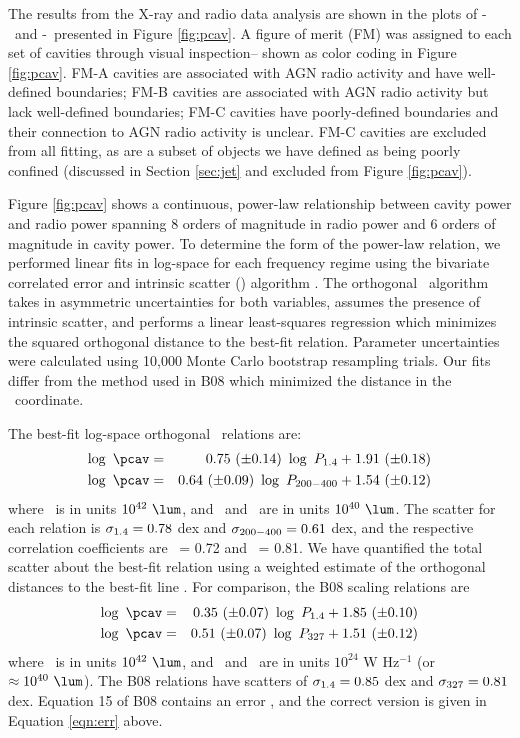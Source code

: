 \documentclass[12pt, preprint]{aastex}
\begin{document}
The results from the X-ray and radio data analysis are shown in the
plots of \pcav-\phigh\ and \pcav-\plow\ presented in Figure
\ref{fig:pcav}. A figure of merit (FM) was assigned to each set of
cavities through visual inspection-- shown as color coding in Figure
\ref{fig:pcav}. FM-A cavities are associated with AGN radio activity
and have well-defined boundaries; FM-B cavities are associated with
AGN radio activity but lack well-defined boundaries; FM-C cavities
have poorly-defined boundaries and their connection to AGN radio
activity is unclear. FM-C cavities are excluded from all fitting, as
are a subset of objects we have defined as being poorly confined
(discussed in Section \ref{sec:jet} and excluded from Figure
\ref{fig:pcav}).

Figure \ref{fig:pcav} shows a continuous, power-law relationship
between cavity power and radio power spanning 8 orders of magnitude in
radio power and 6 orders of magnitude in cavity power. To determine
the form of the power-law relation, we performed linear fits in
log-space for each frequency regime using the bivariate correlated
error and intrinsic scatter (\bces) algorithm \citep{bces}. The
orthogonal \bces\ algorithm takes in asymmetric uncertainties for both
variables, assumes the presence of intrinsic scatter, and performs a
linear least-squares regression which minimizes the squared orthogonal
distance to the best-fit relation. Parameter uncertainties were
calculated using 10,000 Monte Carlo bootstrap resampling trials. Our
fits differ from the method used in B08 which minimized the distance
in the \pcav\ coordinate.

The best-fit log-space orthogonal \bces\ relations are:
\begin{eqnarray}
  \log~\pcav &=& 0.75~(\pm 0.14)~\log~\phigh + 1.91~(\pm 0.18) \label{eqn:high}\\
  \log~\pcav &=& 0.64~(\pm 0.09)~\log~\plow + 1.54~(\pm 0.12) \label{eqn:low}
\end{eqnarray}
where \pcav\ is in units $10^{42} ~\lum$, and \phigh\ and \plow\ are
in units $10^{40} ~\lum$. The scatter for each relation is $\sigma_{\mathrm{1.4}} =
0.78$ dex and $\sigma_{\mathrm{200-400}} = 0.61$ dex, and the respective correlation
coefficients are \rhigh\ = 0.72 and \rlow\ = 0.81. We have quantified
the total scatter about the best-fit relation using a weighted
estimate of the orthogonal distances to the best-fit line
\citep[see][]{2009A&A...498..361P}. For comparison, the B08 scaling
relations are
\begin{eqnarray}
  \log~\pcav &=& 0.35~(\pm 0.07)~\log~\phigh + 1.85~(\pm 0.10) \\
  \log~\pcav &=& 0.51~(\pm 0.07)~\log~\pthree + 1.51~(\pm 0.12) \label{eqn:err}
\end{eqnarray}
where \pcav\ is in units $10^{42} ~\lum$, and \phigh\ and \pthree\ are
in units $10^{24}$ W Hz$^{-1}$ (or $\approx 10^{40} ~\lum$). The B08
relations have scatters of $\sigma_{\mathrm{1.4}} = 0.85$ dex and $\sigma_{\mathrm{327}} = 0.81$
dex. Equation 15 of B08 contains an error \citep{birzan08err}, and the
correct version is given in Equation \ref{eqn:err} above.
\end{document}
